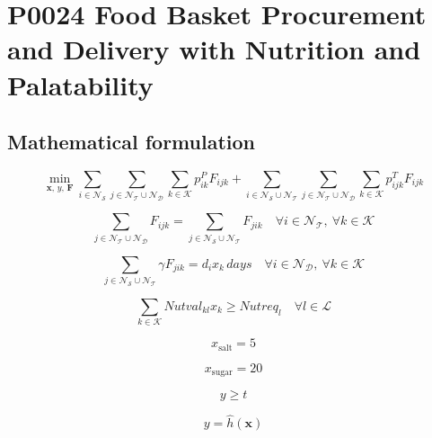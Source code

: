 \documentclass[10pt]{article}
\begin{document}
\section*{P0024 Food Basket Procurement and Delivery with Nutrition and Palatability}
\subsection*{Mathematical formulation}
\begin{equation}
\min_{\boldsymbol{x},\, y,\, \boldsymbol{F}}
\sum_{i \in \mathcal{N}_{\mathcal S}}
\sum_{j \in \mathcal{N}_{\mathcal T} \cup \mathcal{N}_{\mathcal D}}
\sum_{k \in \mathcal K} p_{ik}^P F_{ijk}
+
\sum_{i \in \mathcal{N}_{\mathcal S} \cup \mathcal{N}_{\mathcal T}}
\sum_{j \in \mathcal{N}_{\mathcal T} \cup \mathcal{N}_{\mathcal D}}
\sum_{k \in \mathcal K} p_{ijk}^T F_{ijk}
\tag{6a}
\end{equation}

\begin{equation}
\sum_{j \in \mathcal N_{\mathcal T}\cup\mathcal N_{\mathcal D}} F_{ijk}
=
\sum_{j \in \mathcal N_{\mathcal S}\cup\mathcal N_{\mathcal T}} F_{jik}
\quad \forall i \in \mathcal N_{\mathcal T},\ \forall k \in \mathcal K
\tag{6b}
\end{equation}

\begin{equation}
\sum_{j \in \mathcal N_{\mathcal S} \cup \mathcal N_{\mathcal T}} \gamma F_{jik}
= d_i x_k \, days
\quad \forall i \in \mathcal N_{\mathcal D},\ \forall k \in \mathcal K
\tag{6c}
\end{equation}

\begin{equation}
\sum_{k \in \mathcal K} Nutval_{kl} x_k \ge Nutreq_l
\quad \forall l \in \mathcal L
\tag{6d}
\end{equation}

\begin{equation}
x_{\mathrm{salt}} = 5
\tag{6e}
\end{equation}

\begin{equation}
x_{\mathrm{sugar}} = 20
\tag{6f}
\end{equation}

\begin{equation}
y \ge t
\tag{6g}
\end{equation}

\begin{equation}
y = \hat h(\boldsymbol{x})
\tag{6h}
\end{equation}
\end{document}
